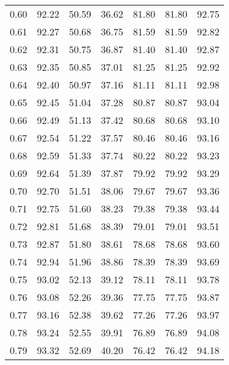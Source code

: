 \begin{tabular}{|c|c|c|c|c|c|c|}
      0.60 &     92.22 &     50.59 &      36.62 &   81.80 &      81.80 &         92.75 \\
      0.61 &     92.27 &     50.68 &      36.75 &   81.59 &      81.59 &         92.82 \\
      0.62 &     92.31 &     50.75 &      36.87 &   81.40 &      81.40 &         92.87 \\
      0.63 &     92.35 &     50.85 &      37.01 &   81.25 &      81.25 &         92.92 \\
      0.64 &     92.40 &     50.97 &      37.16 &   81.11 &      81.11 &         92.98 \\
      0.65 &     92.45 &     51.04 &      37.28 &   80.87 &      80.87 &         93.04 \\
      0.66 &     92.49 &     51.13 &      37.42 &   80.68 &      80.68 &         93.10 \\
      0.67 &     92.54 &     51.22 &      37.57 &   80.46 &      80.46 &         93.16 \\
      0.68 &     92.59 &     51.33 &      37.74 &   80.22 &      80.22 &         93.23 \\
      0.69 &     92.64 &     51.39 &      37.87 &   79.92 &      79.92 &         93.29 \\
      0.70 &     92.70 &     51.51 &      38.06 &   79.67 &      79.67 &         93.36 \\
      0.71 &     92.75 &     51.60 &      38.23 &   79.38 &      79.38 &         93.44 \\
      0.72 &     92.81 &     51.68 &      38.39 &   79.01 &      79.01 &         93.51 \\
      0.73 &     92.87 &     51.80 &      38.61 &   78.68 &      78.68 &         93.60 \\
      0.74 &     92.94 &     51.96 &      38.86 &   78.39 &      78.39 &         93.69 \\
      0.75 &     93.02 &     52.13 &      39.12 &   78.11 &      78.11 &         93.78 \\
      0.76 &     93.08 &     52.26 &      39.36 &   77.75 &      77.75 &         93.87 \\
      0.77 &     93.16 &     52.38 &      39.62 &   77.26 &      77.26 &         93.97 \\
      0.78 &     93.24 &     52.55 &      39.91 &   76.89 &      76.89 &         94.08 \\
      0.79 &     93.32 &     52.69 &      40.20 &   76.42 &      76.42 &         94.18 \\

\end{tabular}
